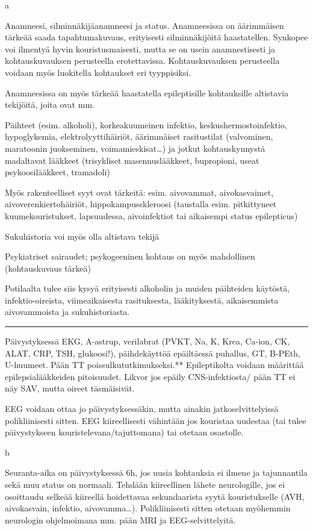 \documentclass[
]{book}
\begin{document}
a

Anamneesi, silminnäkijäanamneesi ja status. Anamneesissa on äärimmäisen tärkeää saada tapahtumakuvaus, erityisesti silminnäkijöitä haastatellen. Synkopee voi ilmentyä hyvin kouristusmaisesti, mutta se on usein anamnestisesti ja kohtauskuvauksen perusteella erotettavissa. Kohtauskuvauksen perusteella voidaan myös luokitella kohtaukset eri tyyppisiksi.

Anamneesissa on myös tärkeää haastatella epileptisille kohtauksille altistavia tekijöitä, joita ovat mm.

Päihteet (esim. alkoholi), korkeakuumeinen infektio, keskushermostoinfektio, hypoglykemia, elektrolyyttihäiriöt, äärimmäiset rasitustilat (valvominen, maratoonin juokseminen, voimamieskisat\ldots) ja jotkut kohtauskynnystä madaltavat lääkkeet (trisykliset masennuslääkkeet, bupropioni, useat psykoosilääkkeet, tramadoli)

Myös rakenteelliset syyt ovat tärkeitä: esim. aivovammat, aivokasvaimet, aivoverenkiertohäiriöt, hippokampusskleroosi (taustalla esim. pitkittyneet kuumekouristukset, lapsuudessa, aivoinfektiot tai aikaisempi status epilepticus)

Sukuhistoria voi myös olla altistava tekijä

Psykiatriset sairaudet; psykogeeninen kohtaus on myös mahdollinen (kohtauskuvaus tärkeä)

Potilaalta tulee siis kysyä erityisesti alkoholin ja muiden päihteiden käytöstä, infektio-oireista, viimeaikaisesta rasituksesta, lääkityksestä, aikaisemmista aivovammoista ja sukuhistoriasta.

\begin{center}\rule{0.5\linewidth}{0.5pt}\end{center}

Päivystyksessä EKG, A-astrup, verilabrat (PVKT, Na, K, Krea, Ca-ion, CK, ALAT, CRP, TSH, glukoosi!), päihdekäyttöä epäiltäessä puhallus, GT, B-PEth, U-huumeet. Pään TT poissulkututkimukseksi.** Epileptikolta voidaan määrittää epilepsialääkkeiden pitoisuudet. Likvor jos epäily CNS-infektiosta/ pään TT ei näy SAV, mutta oireet täsmäisivät.

EEG voidaan ottaa jo päivystyksessäkin, mutta ainakin jatkoselvittelyissä polikliinisesti sitten. EEG kiireellisesti vähintään jos kouristaa uudestaa (tai tulee päivystykseen kouristelevana/tajuttomana) tai otetaan osastolle.

b

Seuranta-aika on päivystyksessä 6h, jos uusia kohtauksia ei ilmene ja tajunnantila sekä muu status on normaali. Tehdään kiireellinen lähete neurologille, jos ei osoittaudu selkeää kiireellä hoidettavaa sekundaarista syytä kouristukselle (AVH, aivokasvain, infektio, aivovamma\ldots). Polikliinisesti sitten otetaan myöhemmin neurologin ohjelmoimana mm. pään MRI ja EEG-selvittelyitä.
\end{document}

